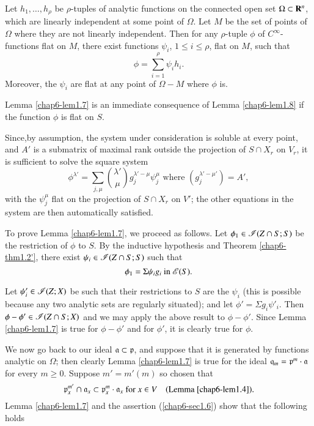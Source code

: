 \begin{lemma}\label{chap6-lem1.8}
Let $h_{1},\ldots,h_{\rho}$ be $\rho$-tuples of analytic functions on the connected open set $\Omega\subset \mathbf{R}^{n}$, which are linearly independent at some point of $\Omega$. Let $M$ be the set of points of $\Omega$ where they are not linearly independent. Then for any $\rho$-tuple $\phi$ of $C^{\infty}$-functions flat on $M$, there exist functions $\psi_{i}$, $1\leq i\leq \rho$, flat on $M$, such that
$$
\phi=\sum\limits^{\rho}_{i=1}\psi_{i}h_{i}.
$$
Moreover, the $\psi_{i}$ are flat at any point of $\Omega-M$ where $\phi$ is.
\end{lemma}

Lemma \ref{chap6-lem1.7} is an immediate consequence of Lemma \ref{chap6-lem1.8} if the function $\phi$ is flat on $S$.

Since,\pageoriginale by assumption, the system under consideration is soluble at every point, and $A'$ is a submatrix of maximal rank outside the projection of $S\cap X_{r}$ on $V_{r}$, it is sufficient to solve the square system
$$
\phi^{\lambda'}=\sum\limits_{j,\mu}\binom{\lambda'}{\mu}g^{\lambda'-\mu}_{j}\psi^{\mu}_{j}\text{ where } (g^{\lambda'-\mu'}_{j})=A',
$$
with the $\psi^{\mu}_{j}$ flat on the projection of $S\cap X_{r}$ on $V'$; the other equations in the system are then automatically satisfied.

To prove Lemma \ref{chap6-lem1.7}, we proceed as follows. Let $\phi_{1}\in \mathscr{I}(Z\cap S;S)$ be the restriction of $\phi$ to $S$. By the inductive hypothesis and Theorem \ref{chap6-thm1.2'}, there exist $\psi_{i}\in\mathscr{I}(Z\cap S;S)$ such that
$$
\phi_{1}=\Sigma \psi_{i}g_{i}\text{ in } \mathscr{E}(S).
$$

Let $\psi'_{i}\in \mathscr{I}(Z;X)$ be such that their restrictions to $S$ are the $\psi_{i}$ (this is possible because any two analytic sets are regularly situated); and let $\phi'=\Sigma g_{i}\psi'_{i}$. Then $\phi-\phi'\in \mathscr{I}(Z\cap S;X)$ and we may apply the above result to $\phi-\phi'$. Since Lemma \ref{chap6-lem1.7} is true for $\phi-\phi'$ and for $\phi'$, it is clearly true for $\phi$.

We now go back to our ideal $\mathfrak{a}\subset\mathfrak{p}$, and suppose that it is generated by functions analytic on $\Omega$; then clearly Lemma \ref{chap6-lem1.7} is true for the ideal $\mathfrak{q}_{m}=\mathfrak{p}^{m}\cdot \mathfrak{a}$ for every $m\geq 0$. Suppose $m'=m'(m)$ so chosen that
\setcounter{equation}{8}
\begin{equation}
\mathfrak{p}^{m'}_{x}\cap \mathfrak{a}_{x}\subset \mathfrak{p}^{m}_{x}\cdot \mathfrak{a}_{x}\text{ for } x\in V\quad \text{(Lemma \ref{chap6-lem1.4}).}\label{chap6-eq1.9}
\end{equation}
Lemma \ref{chap6-lem1.7} and the assertion (\ref{chap6-sec1.6}) show that the following holds 

